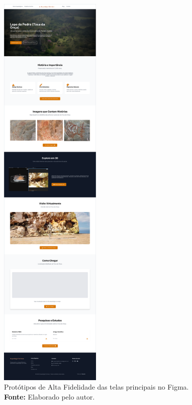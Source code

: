 \begin{figure}[H]
    \centering
    \includegraphics[height=20cm, keepaspectratio]{img/Protótipo/prototipo alta fidelidade toca da onça.png}
    \caption{ Protótipos de Alta Fidelidade das telas principais no Figma. \\
        \textbf{Fonte:} Elaborado pelo autor.}
    \label{fig:prototipo_alta_fidelidade}
\end{figure}


